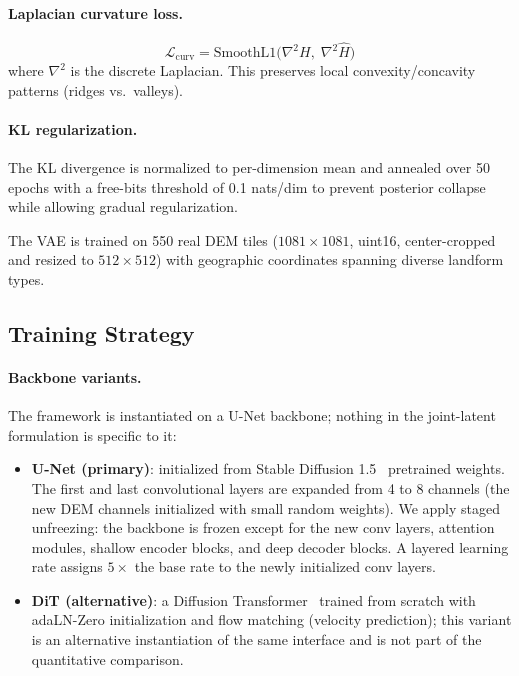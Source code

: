 \documentclass[review]{vgtc}                 %
\begin{document}
\paragraph{Laplacian curvature loss.}
\begin{equation}
  \mathcal{L}_{\text{curv}} = \text{SmoothL1}\big(\nabla^2 H,\; \nabla^2 \hat{H}\big)
  \label{eq:curv_loss}
\end{equation}
where $\nabla^2$ is the discrete Laplacian. This preserves local convexity/concavity patterns (ridges vs.\ valleys).

\paragraph{KL regularization.}
The KL divergence is normalized to per-dimension mean and annealed over 50 epochs with a free-bits threshold of 0.1 nats/dim to prevent posterior collapse while allowing gradual regularization.

The VAE is trained on 550 real DEM tiles ($1081 \times 1081$, uint16, center-cropped and resized to $512 \times 512$) with geographic coordinates spanning diverse landform types.

\subsection{Training Strategy}
\label{sec:training}

\paragraph{Backbone variants.}
The framework is instantiated on a U-Net backbone; nothing in the joint-latent formulation is specific to it:
\begin{itemize}
  \item \textbf{U-Net (primary)}: initialized from Stable Diffusion 1.5~\cite{LDM:2022} pretrained weights. The first and last convolutional layers are expanded from 4 to 8 channels (the new DEM channels initialized with small random weights). We apply staged unfreezing: the backbone is frozen except for the new conv layers, attention modules, shallow encoder blocks, and deep decoder blocks. A layered learning rate assigns $5\times$ the base rate to the newly initialized conv layers.
  \item \textbf{DiT (alternative)}: a Diffusion Transformer~\cite{DiT:2023} trained from scratch with adaLN-Zero initialization and flow matching (velocity prediction); this variant is an alternative instantiation of the same interface and is not part of the quantitative comparison.
\end{itemize}
\end{document}
